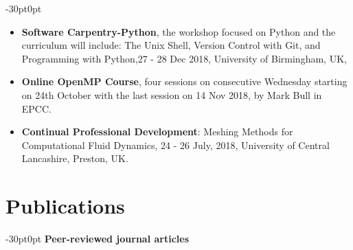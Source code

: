 \documentclass[line]{res}
\newenvironment{p1}
{\begin{adjustwidth}{-30pt}{0pt}
\vspace{8pt}}
{\end{adjustwidth}}
\begin{document}
\begin{resume}
\begin{p1}
\begin{itemize}
	\item \textbf{Software Carpentry-Python}, the workshop focused on Python and the curriculum will include: The Unix Shell, Version Control with Git, and Programming with Python,27 - 28 Dec 2018, University of Birmingham, UK,  
	\item 	\textbf{Online OpenMP Course},  four sessions on consecutive Wednesday starting on 24th October with the last session on 14 Nov 2018, by Mark Bull in EPCC.
	\item \textbf{Continual Professional Development}: Meshing Methods for Computational Fluid Dynamics, 24 - 26 July, 2018, University of Central Lancashire, Preston, UK. 
\end{itemize}
\end{p1}


\section{Publications}

\begin{p1}
\textbf{Peer-reviewed journal articles}
\begin{etaremune}
    \item {}
    \item {}
    \item {}
    \item {}
    \item {}
    \item {}
    \item {}
    \item {}
    \item {}
    \item {}
    \item {}
    \item {}
    \item {}
    \item {}
\end{etaremune}
\end{p1}




\end{resume}
\end{document}
